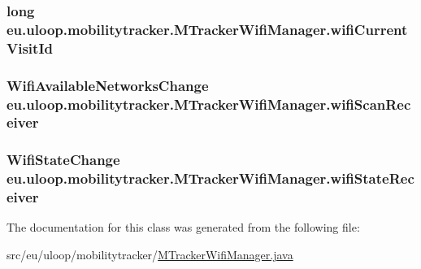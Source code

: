 \hypertarget{classeu_1_1uloop_1_1mobilitytracker_1_1MTrackerWifiManager_af4c667aa1375701ea4249214d3fd6a24}{
\subsubsection[{wifi\+Current\+Visit\+Id}]{\setlength{\rightskip}{0pt plus 5cm}long eu.\+uloop.\+mobilitytracker.\+M\+Tracker\+Wifi\+Manager.\+wifi\+Current\+Visit\+Id\hspace{0.3cm}{\ttfamily [private]}}}\label{classeu_1_1uloop_1_1mobilitytracker_1_1MTrackerWifiManager_af4c667aa1375701ea4249214d3fd6a24}
\hypertarget{classeu_1_1uloop_1_1mobilitytracker_1_1MTrackerWifiManager_af961ecc022f7a22e2258ba748f2abbab}{
\subsubsection[{wifi\+Scan\+Receiver}]{\setlength{\rightskip}{0pt plus 5cm}Wifi\+Available\+Networks\+Change eu.\+uloop.\+mobilitytracker.\+M\+Tracker\+Wifi\+Manager.\+wifi\+Scan\+Receiver\hspace{0.3cm}{\ttfamily [private]}}}\label{classeu_1_1uloop_1_1mobilitytracker_1_1MTrackerWifiManager_af961ecc022f7a22e2258ba748f2abbab}
\hypertarget{classeu_1_1uloop_1_1mobilitytracker_1_1MTrackerWifiManager_a3222b93c74d48805b64d8bc0ffddf985}{
\subsubsection[{wifi\+State\+Receiver}]{\setlength{\rightskip}{0pt plus 5cm}Wifi\+State\+Change eu.\+uloop.\+mobilitytracker.\+M\+Tracker\+Wifi\+Manager.\+wifi\+State\+Receiver\hspace{0.3cm}{\ttfamily [private]}}}\label{classeu_1_1uloop_1_1mobilitytracker_1_1MTrackerWifiManager_a3222b93c74d48805b64d8bc0ffddf985}


The documentation for this class was generated from the following file\+:\begin{DoxyCompactItemize}
\item 
src/eu/uloop/mobilitytracker/\hyperlink{MTrackerWifiManager_8java}{M\+Tracker\+Wifi\+Manager.\+java}\end{DoxyCompactItemize}

